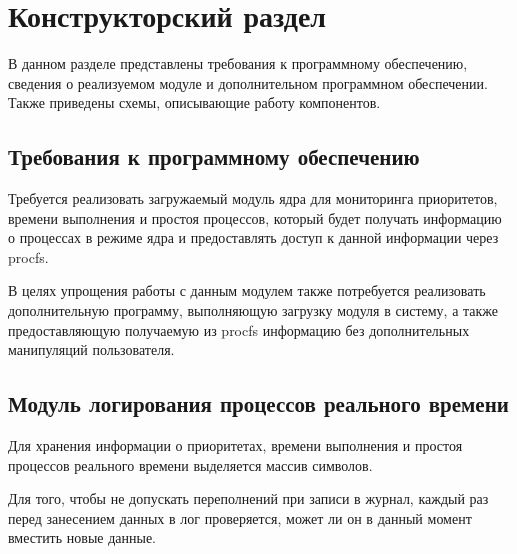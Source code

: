 \section{Конструкторский раздел}
В данном разделе представлены требования к программному обеспечению, сведения о реализуемом модуле и дополнительном программном обеспечении. Также приведены схемы, описывающие работу компонентов.

\subsection{Требования к программному обеспечению}
Требуется реализовать загружаемый модуль ядра для мониторинга приоритетов, времени выполнения и простоя процессов, который будет получать информацию о процессах в режиме ядра и предоставлять доступ к данной информации через procfs.

В целях упрощения работы с данным модулем также потребуется реализовать дополнительную программу, выполняющую загрузку модуля в систему, а также предоставляющую получаемую из procfs информацию без дополнительных манипуляций пользователя.

\subsection{Модуль логирования процессов реального времени}
Для хранения информации о приоритетах, времени выполнения и простоя процессов реального времени выделяется массив символов.


Для того, чтобы не допускать переполнений при записи в журнал, каждый раз перед занесением данных в лог проверяется, может ли он в данный момент вместить новые данные.


